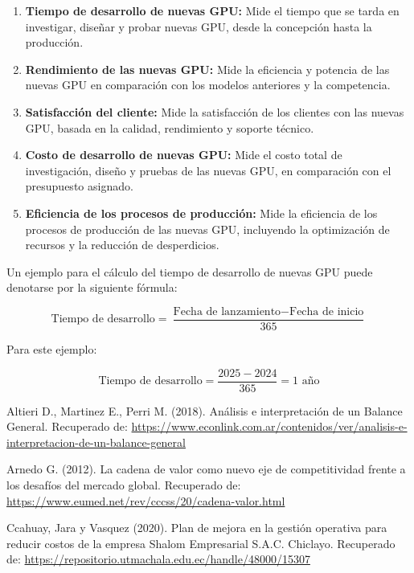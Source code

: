\documentclass{article}
\begin{document}
\begin{enumerate}
  \item \textbf{Tiempo de desarrollo de nuevas GPU:} Mide el tiempo que se tarda en investigar, diseñar y probar nuevas GPU, desde la concepción hasta la producción.
  \item \textbf{Rendimiento de las nuevas GPU:} Mide la eficiencia y potencia de las nuevas GPU en comparación con los modelos anteriores y la competencia.
  \item \textbf{Satisfacción del cliente:} Mide la satisfacción de los clientes con las nuevas GPU, basada en la calidad, rendimiento y soporte técnico.
  \item \textbf{Costo de desarrollo de nuevas GPU:} Mide el costo total de investigación, diseño y pruebas de las nuevas GPU, en comparación con el presupuesto asignado.
  \item \textbf{Eficiencia de los procesos de producción:} Mide la eficiencia de los procesos de producción de las nuevas GPU, incluyendo la optimización de recursos y la reducción de desperdicios.
\end{enumerate}

Un ejemplo para el cálculo del tiempo de desarrollo de nuevas GPU puede denotarse por la siguiente fórmula:

\begin{equation}
  \text{Tiempo de desarrollo} = \frac{\text{Fecha de lanzamiento} - \text{Fecha de inicio}}{365}
\end{equation}

Para este ejemplo:

\begin{equation}
  \text{Tiempo de desarrollo} = \frac{2025 - 2024}{365} = 1 \text{ año}
\end{equation}

\newpage

\begin{thebibliography}{9}

  Altieri D., Martinez E., Perri M. (2018). Análisis e interpretación de un Balance General. Recuperado de: \url{https://www.econlink.com.ar/contenidos/ver/analisis-e-interpretacion-de-un-balance-general}

  Arnedo G. (2012). La cadena de valor como nuevo eje de competitividad frente a los desafíos del mercado global. Recuperado de: \url{https://www.eumed.net/rev/cccss/20/cadena-valor.html}

  Ccahuay, Jara y Vasquez (2020). Plan de mejora en la gestión operativa para reducir costos de la empresa Shalom Empresarial S.A.C. Chiclayo. Recuperado de: \url{https://repositorio.utmachala.edu.ec/handle/48000/15307}

\end{thebibliography}

  
\end{document}
